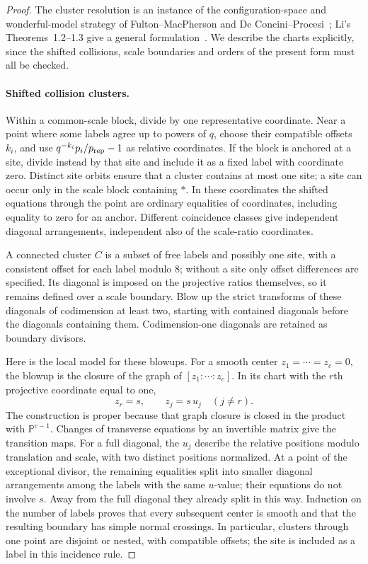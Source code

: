 \begin{proof}
The cluster resolution is an instance of the configuration-space and wonderful-model strategy of Fulton--MacPherson and De Concini--Procesi~\cite{FultonMacPherson1994,DeConciniProcesi1995}; Li's Theorems~1.2--1.3 give a general formulation~\cite{Li2009Wonderful}. We describe the charts explicitly, since the shifted collisions, scale boundaries and orders of the present form must all be checked.

\paragraph{Shifted collision clusters.}
Within a common-scale block, divide by one representative coordinate.
Near a point where some labels agree up to powers of $q$, choose their
compatible offsets $k_i$, and use $q^{-k_i}p_i/p_{\rm rep}-1$ as relative
coordinates. If the block is anchored at a site, divide instead by that site
and include it as a fixed label with coordinate zero. Distinct site orbits
ensure that a cluster contains at most one site; a site can occur only in
the scale block containing $*$. In these coordinates the shifted equations
through the point are ordinary equalities of coordinates, including equality
to zero for an anchor. Different coincidence classes give independent
diagonal arrangements, independent also of the scale-ratio coordinates.

A connected cluster $C$ is a subset of free labels and possibly one site,
with a consistent offset for each label modulo $8$; without a site only
offset differences are specified. Its diagonal is imposed on the projective
ratios themselves, so it remains defined over a scale boundary. Blow up
the strict transforms of these diagonals of codimension at least two,
starting with contained diagonals before the diagonals containing them.
Codimension-one diagonals are retained as boundary divisors.

Here is the local model for these blowups. For a smooth center
$z_1=\cdots=z_c=0$, the blowup is the closure of the graph of
$[z_1:\cdots:z_c]$. In its chart with the $r$th projective coordinate equal
to one,
\[
 z_r=s,\qquad z_j=s\,u_j\quad(j\ne r).
\]
The construction is proper because that graph closure is closed in the
product with $\mathbb P^{c-1}$. Changes of transverse equations by an
invertible matrix give the transition maps. For a full diagonal, the $u_j$
describe the relative positions modulo translation and scale, with two
distinct positions normalized. At a point of the exceptional divisor,
the remaining equalities split into smaller diagonal arrangements among
the labels with the same $u$-value; their equations do not involve $s$.
Away from the full diagonal they already split in this way. Induction on
the number of labels proves that every subsequent center is smooth and
that the resulting boundary has simple normal crossings. In particular,
clusters through one point are disjoint or nested, with compatible offsets;
the site is included as a label in this incidence rule.


\end{proof}
